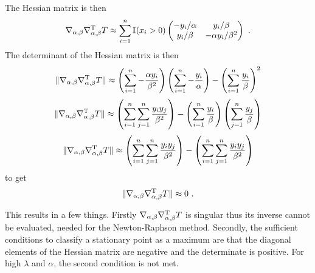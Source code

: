 The Hessian matrix is then
\begin{equation}
	\nabla_{\alpha,\beta}\nabla_{\alpha,\beta}^\textup{T} T \approx
	\sum_{i=1}^n
	\mathbb{I}(x_i>0)
	\begin{pmatrix}
		-y_i/\alpha  & y_i/\beta \\
		y_i/\beta & -\alpha y_i/\beta^2
	\end{pmatrix}
	\ . 
\end{equation}
The determinant of the Hessian matrix is then
\begin{equation*}
	\|\nabla_{\alpha,\beta}\nabla_{\alpha,\beta}^\textup{T} T\|
	\approx
	\left(\sum_{i=1}^n-\frac{\alpha y_i}{\beta^2}\right)
	\left(\sum_{i=1}^n-\frac{y_i}{\alpha}\right) - \left(\sum_{i=1}^n\frac{y_i}{\beta}\right)^2
\end{equation*}
\begin{equation*}
	\|\nabla_{\alpha,\beta}\nabla_{\alpha,\beta}^\textup{T} T\|
	\approx
	\left(\sum_{i=1}^n\sum_{j=1}^n\frac{y_iy_j}{\beta^2}\right)
	 - \left(\sum_{i=1}^n\frac{y_i}{\beta}\right)\left(\sum_{j=1}^n\frac{y_j}{\beta}\right)
\end{equation*}
\begin{equation*}
	\|\nabla_{\alpha,\beta}\nabla_{\alpha,\beta}^\textup{T} T\|
	\approx
	\left(\sum_{i=1}^n\sum_{j=1}^n\frac{y_iy_j}{\beta^2}\right)
	 - \left(\sum_{i=1}^n\sum_{j=1}^n\frac{y_iy_j}{\beta^2}\right)
\end{equation*}
to get
\begin{equation}
	\|\nabla_{\alpha,\beta}\nabla_{\alpha,\beta}^\textup{T} T\|
	\approx
	0
	\ .
\end{equation}

This results in a few things. Firstly $\nabla_{\alpha,\beta}\nabla_{\alpha,\beta}^\textup{T} T$ is singular thus its inverse cannot be evaluated, needed for the Newton-Raphson method. Secondly, the sufficient conditions to classify a stationary point as a maximum are that the diagonal elements of the Hessian matrix are negative and the determinate is positive. For high $\lambda$ and $\alpha$, the second condition is not met.

